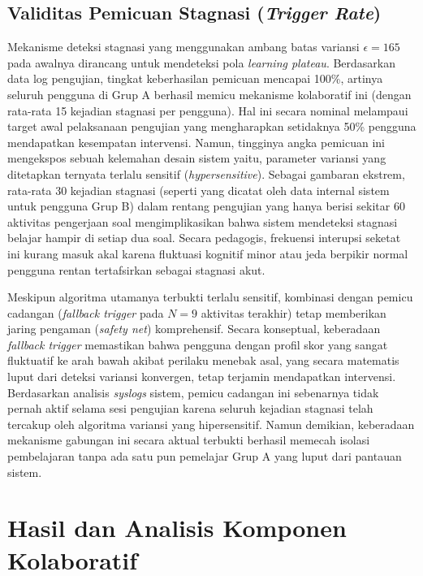 \subsection{Validitas Pemicuan Stagnasi (\textit{Trigger Rate})}
Mekanisme deteksi stagnasi yang menggunakan ambang batas variansi $\epsilon = 165$ pada awalnya dirancang untuk mendeteksi pola \textit{learning plateau}. Berdasarkan data log pengujian, tingkat keberhasilan pemicuan mencapai 100\%, artinya seluruh pengguna di Grup A berhasil memicu mekanisme kolaboratif ini (dengan rata-rata 15 kejadian stagnasi per pengguna). Hal ini secara nominal melampaui target awal pelaksanaan pengujian yang mengharapkan setidaknya 50\% pengguna mendapatkan kesempatan intervensi. Namun, tingginya angka pemicuan ini mengekspos sebuah kelemahan desain sistem yaitu, parameter variansi yang ditetapkan ternyata terlalu sensitif (\textit{hypersensitive}). Sebagai gambaran ekstrem, rata-rata 30 kejadian stagnasi (seperti yang dicatat oleh data internal sistem untuk pengguna Grup B) dalam rentang pengujian yang hanya berisi sekitar 60 aktivitas pengerjaan soal mengimplikasikan bahwa sistem mendeteksi stagnasi belajar hampir di setiap dua soal. Secara pedagogis, frekuensi interupsi seketat ini kurang masuk akal karena fluktuasi kognitif minor atau jeda berpikir normal pengguna rentan tertafsirkan sebagai stagnasi akut.

Meskipun algoritma utamanya terbukti terlalu sensitif, kombinasi dengan pemicu cadangan (\textit{fallback trigger} pada $N=9$ aktivitas terakhir) tetap memberikan jaring pengaman (\textit{safety net}) komprehensif. Secara konseptual, keberadaan \textit{fallback trigger} memastikan bahwa pengguna dengan profil skor yang sangat fluktuatif ke arah bawah akibat perilaku menebak asal, yang secara matematis luput dari deteksi variansi konvergen, tetap terjamin mendapatkan intervensi. Berdasarkan analisis \textit{syslogs} sistem, pemicu cadangan ini sebenarnya tidak pernah aktif selama sesi pengujian karena seluruh kejadian stagnasi telah tercakup oleh algoritma variansi yang hipersensitif. Namun demikian, keberadaan mekanisme gabungan ini secara aktual terbukti berhasil memecah isolasi pembelajaran tanpa ada satu pun pemelajar Grup A yang luput dari pantauan sistem.

\section{Hasil dan Analisis Komponen Kolaboratif}
\label{sec:hasil_kolaborasi}

